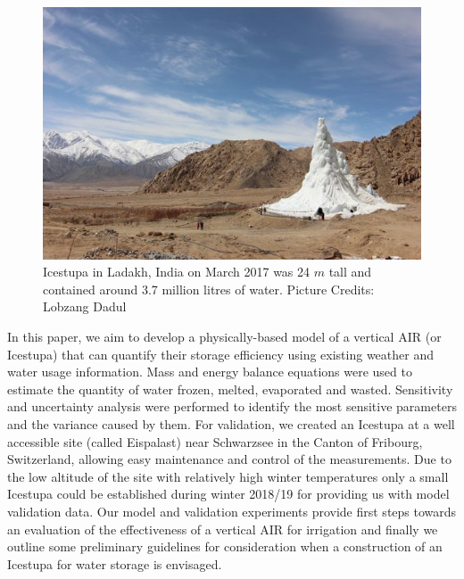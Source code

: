 \documentclass[utf8]{frontiersSCNS} %
\begin{document}
  \begin{figure} \begin{center} \includegraphics[width=10 cm]{Figures/Figure_1.jpg} \end{center} \caption{Icestupa in
Ladakh, India on March 2017 was 24 $m$ tall and contained around 3.7 million litres of water. Picture Credits: Lobzang
Dadul} \label{fig:cone} \end{figure}
  

In this paper, we aim to develop a physically-based model of a vertical AIR (or Icestupa) that can quantify their
storage efficiency using existing weather and water usage information. Mass and energy balance equations were used to
estimate the quantity of water frozen, melted, evaporated and wasted. Sensitivity and uncertainty analysis were
performed to identify the most sensitive parameters and the variance caused by them. For validation, we created an
Icestupa at a well accessible site (called Eispalast) near Schwarzsee in the Canton of Fribourg, Switzerland, allowing
easy maintenance and control of the measurements. Due to the low altitude of the site with relatively high winter
temperatures only a small Icestupa could be established during winter 2018/19 for providing us with model validation
data. Our model and validation experiments provide first steps towards an evaluation of the effectiveness of a vertical
AIR for irrigation and finally we outline some preliminary guidelines for consideration when a construction of an
Icestupa for water storage is envisaged.
\end{document}
